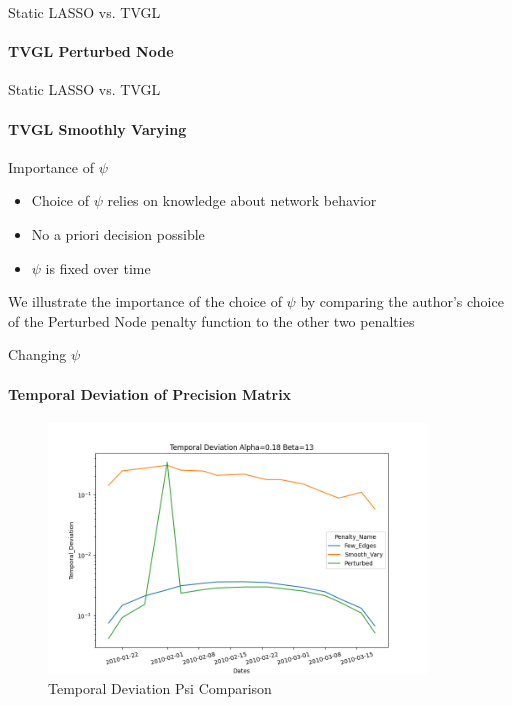 \documentclass{beamer}
\begin{document}
\begin{frame}{Static LASSO vs. TVGL}
\framesubtitle{TVGL Perturbed Node}
\begin{center}
\end{center}
\end{frame}

\begin{frame}{Static LASSO vs. TVGL}
\framesubtitle{TVGL Smoothly Varying}
\begin{figure}
\end{figure}
\end{frame}

\begin{frame}{Importance of $\psi$}
    \begin{itemize}
        \item Choice of $\psi$ relies on knowledge about network behavior
        \item No a priori decision possible
        \item $\psi$ is fixed over time
    \end{itemize}
    We illustrate the importance of the choice of $\psi$ by comparing the author's choice of the Perturbed Node penalty function to the other two penalties
\end{frame}

\begin{frame}{Changing $\psi$}
\framesubtitle{Temporal Deviation of Precision Matrix}

\begin{figure}
  \includegraphics[width=10cm]{TemporalDevPsi1_3_5Alpha0.18Beta13.png}
  \caption{Temporal Deviation Psi Comparison}
  \label{fig:TempDev}
\end{figure}

\end{frame}
\end{document}
